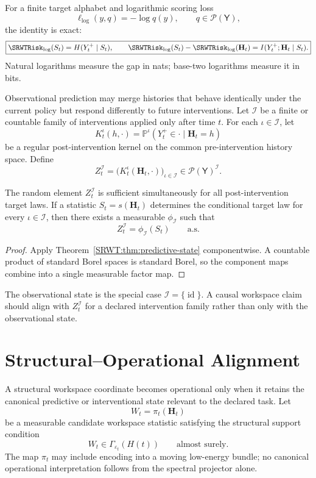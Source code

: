 For a finite target alphabet and logarithmic scoring loss
\[
\ell_{\log}(y,q)=-\log q(y),
\qquad
q\in\mathcal P(\mathsf Y),
\]
the identity is exact:
\[
\boxed{
\SRWTRisk_{\log}(S_t)=H(Y_t^+\mid S_t),
\qquad
\SRWTRisk_{\log}(S_t)-\SRWTRisk_{\log}(\mathbf H_t)
=
I(Y_t^+;\mathbf H_t\mid S_t).
}
\]
Natural logarithms measure the gap in nats; base-two logarithms measure it in
bits.


Observational prediction may merge histories that behave identically under the
current policy but respond differently to future interventions. Let
\(\mathcal I\) be a finite or countable family of interventions applied only
after time \(t\). For each \(\iota\in\mathcal I\), let
\[
K_t^{\iota}(h,\cdot)
=
\mathbb P^{\iota}(Y_t^+\in\cdot\mid\mathbf H_t=h)
\]
be a regular post-intervention kernel on the common pre-intervention history
space. Define
\[
\boxed{
Z_t^{\mathcal I}
=
\bigl(K_t^{\iota}(\mathbf H_t,\cdot)\bigr)_{\iota\in\mathcal I}
\in
\mathcal P(\mathsf Y)^{\mathcal I}.
}
\]

\begin{SRWTcorollary}
\label{SRWT:cor:interventional-state}
The random element \(Z_t^{\mathcal I}\) is sufficient simultaneously for all
post-intervention target laws. If a statistic \(S_t=s(\mathbf H_t)\)
determines the conditional target law for every \(\iota\in\mathcal I\), then
there exists a measurable \(\phi_{\mathcal I}\) such that
\[
Z_t^{\mathcal I}=\phi_{\mathcal I}(S_t)
\qquad\text{a.s.}
\]
\end{SRWTcorollary}

\begin{proof}
Apply Theorem~\ref{SRWT:thm:predictive-state} componentwise. A countable product of
standard Borel spaces is standard Borel, so the component maps combine into a
single measurable factor map.
\end{proof}

The observational state is the special case
\(\mathcal I=\{\operatorname{id}\}\). A causal workspace claim should align
with \(Z_t^{\mathcal I}\) for a declared intervention family rather than only
with the observational state.

\section{Structural--Operational Alignment}

A structural workspace coordinate becomes operational only when it retains the
canonical predictive or interventional state relevant to the declared task.
Let
\[
W_t=\pi_t(\mathbf H_t)
\]
be a measurable candidate workspace statistic satisfying the structural support
condition
\[
W_t\in\Gamma_{\varepsilon_t}(H(t))
\qquad\text{almost surely}.
\]
The map \(\pi_t\) may include encoding into a moving low-energy bundle; no
canonical operational interpretation follows from the spectral projector
alone.

